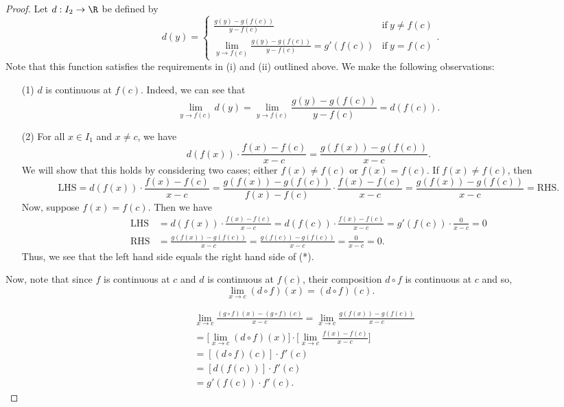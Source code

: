 \begin{proof}
Let \( d: {I}_{2} \to \R  \) be defined by 
\[  d(y) = 
\begin{cases}
    \frac{ g(y) - g(f(c)) }{ y - f(c) }  &\text{if} \ y \neq f(c) \\
    \lim_{ y \to f(c) } \frac{ g(y) - g(f(c)) }{  y - f(c) }  = g'(f(c)) &\text{if} \ y = f(c)
\end{cases}. \]
Note that this function satisfies the requirements in (i) and (ii) outlined above. We make the following observations: 
\begin{enumerate}
    \item[(1)] \( d  \) is continuous at \( f(c) \). Indeed, we can see that 
        \[  \lim_{ y \to f(c) }  d(y) = \lim_{ y  \to  f(c) }  \frac{ g(y) - g(f(c)) }{ y - f(c) }  = d(f(c)). \]
    \item[(2)] For all \( x \in {I}_{1} \) and \( x \neq c  \), we have 
        \[  d(f(x)) \cdot \frac{ f(x) - f(c) }{  x -c  }  = \frac{ g(f(x)) - g(f(c))  }{  x - c  }. \tag{*}  \]
        We will show that this holds by considering two cases; either \( f(x) \neq f(c) \) or \( f(x) = f(c) \). If \( f(x) \neq f(c) \), then
        \[  \text{LHS} = d(f(x))\cdot \frac{ f(x) - f(c) }{ x - c  } = \frac{ g(f(x)) - g(f(c)) }{  f(x) - f(c) }  \cdot \frac{ f(x) - f(c) }{  x - c  } = \frac{ g(f(x)) - g(f(c))  }{  x - c  }  = \text{RHS}.    \]
        Now, suppose \( f(x) = f(c) \). Then we have 
        \begin{align*}
            \text{LHS} &= d(f(x)) \cdot \frac{ f(x) - f(c) }{  x - c  }  = d(f(c)) \cdot \frac{ f(x) - f(c) }{ x - c  }  = g'(f(c)) \cdot \frac{ 0  }{ x -c  }  = 0  \\
            \text{RHS} &= \frac{ g(f(x)) - g(f(c)) }{  x - c  }  = \frac{ g(f(c)) - g(f(c)) }{ x - c  }  = \frac{ 0  }{ x -c  }   =0.
        \end{align*}
        Thus, we see that the left hand side equals the right hand side of (*).
\end{enumerate}
Now, note that since \( f  \) is continuous at \( c  \) and \( d \) is continuous at \( f(c) \), their composition \( d \circ f  \) is continuous at \( c  \) and so,
\[  \lim_{ x \to c  }  (d \circ f)(x) = (d \circ f)(c). \]

\begin{align*}
    &\lim_{ x \to c  } \frac{ (g \circ f)(x) - (g \circ f)(c) }{ x - c  } = \lim_{ x \to c  }  \frac{ g(f(x)) - g(f(c)) }{ x - c  }  \\
                                            &= \Big[ \lim_{ x  \to c  }  (d \circ f ) (x) \Big] \cdot \Big[ \lim_{ x \to  c  }  \frac{ f(x) - f(c) }{  x - c  } \Big] \\
                                            &= [(d \circ f)(c)] \cdot f'(c) \\
                                            &= [d(f(c))] \cdot f'(c) \\
                                            &= g'(f(c)) \cdot f'(c).
\end{align*}
\end{proof}

